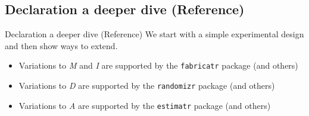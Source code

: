 \documentclass[
  11pt,
  ignorenonframetext,
]{beamer}
\providecommand{\tightlist}{%
  \setlength{\itemsep}{0pt}\setlength{\parskip}{0pt}}\usepackage{longtable,booktabs,array}
\begin{document}
\hypertarget{declaration-a-deeper-dive-reference}{%
\subsection{Declaration a deeper dive
(Reference)}\label{declaration-a-deeper-dive-reference}}

\begin{frame}[fragile]{Declaration a deeper dive (Reference)}
We start with a simple experimental design and then show ways to extend.

\begin{itemize}
\tightlist
\item
  Variations to \emph{M} and \emph{I} are supported by the
  \texttt{fabricatr} package (and others)
\item
  Variations to \emph{D} are supported by the \texttt{randomizr} package
  (and others)
\item
  Variations to \emph{A} are supported by the \texttt{estimatr} package
  (and others)
\end{itemize}
\end{frame}
\end{document}
